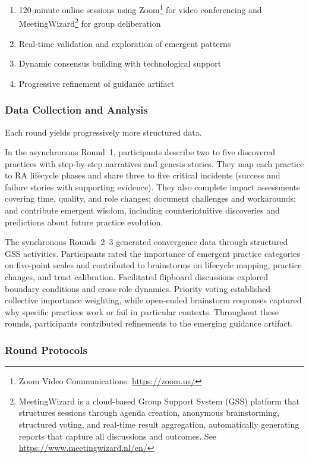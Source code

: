 \begin{enumerate}
    \item 120-minute online sessions using Zoom\footnote{Zoom Video Communications: \url{https://zoom.us/}} for video conferencing and MeetingWizard\footnote{MeetingWizard is a cloud-based Group Support System (GSS) platform that structures sessions through agenda creation, anonymous brainstorming, structured voting, and real-time result aggregation, automatically generating reports that capture all discussions and outcomes. See \url{https://www.meetingwizard.nl/en/}} for group deliberation
    \item Real-time validation and exploration of emergent patterns
    \item Dynamic consensus building with technological support
    \item Progressive refinement of guidance artifact
\end{enumerate}

\subsubsection{Data Collection and Analysis}

Each round yields progressively more structured data.

In the asynchronous Round~1, participants describe two to five discovered
practices with step-by-step narratives and genesis stories. They map each
practice to RA lifecycle phases and share three to five critical incidents
(success and failure stories with supporting evidence). They also complete
impact assessments covering time, quality, and role changes; document
challenges and workarounds; and contribute emergent wisdom, including
counterintuitive discoveries and predictions about future practice evolution.

The synchronous Rounds~2--3 generated convergence data through structured GSS
activities. Participants rated the importance of emergent practice categories
on five-point scales and contributed to brainstorms on lifecycle mapping,
practice changes, and trust calibration. Facilitated flipboard discussions
explored boundary conditions and cross-role dynamics. Priority voting
established collective importance weighting, while open-ended brainstorm
responses captured why specific practices work or fail in particular contexts.
Throughout these rounds, participants contributed refinements to the emerging
guidance artifact.

\subsubsection{Round Protocols}

